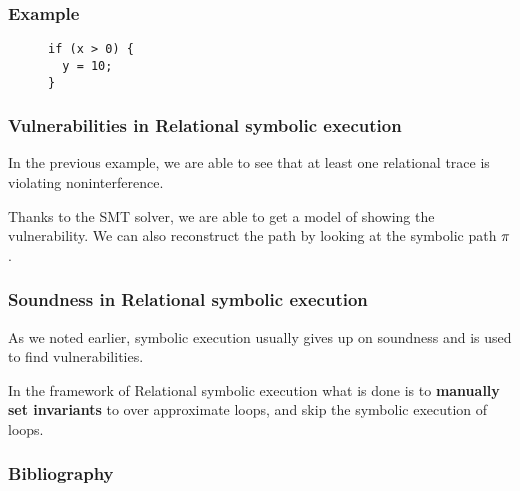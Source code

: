 \documentclass{beamer}
\begin{document}
\begin{frame}[fragile]
  \frametitle{Example}
  \begin{figure}[htp]
  \centering
  \begin{verbatim}
if (x > 0) {
  y = 10;
}
  \end{verbatim}
  \end{figure}
  \begin{figure}
  \end{figure}
\end{frame}

\begin{frame}
  \frametitle{Vulnerabilities in Relational symbolic execution}
  In the previous example, we are able to see that at least one relational trace is violating
  noninterference.

  \vspace{1em}
  Thanks to the SMT solver, we are able to get a model of showing the vulnerability. We can also
  reconstruct the path by looking at the symbolic path $\pi$.
\end{frame}

\begin{frame}
  \frametitle{Soundness in Relational symbolic execution}
  As we noted earlier, symbolic execution usually gives up on soundness and is used to find
  vulnerabilities.

  \vspace{1em}
  In the framework of Relational symbolic execution what is done is to \textbf{manually set invariants}
  to over approximate loops, and skip the symbolic execution of loops.
\end{frame}



\begin{frame}[allowframebreaks]
\frametitle{Bibliography}

\end{frame}
\end{document}
